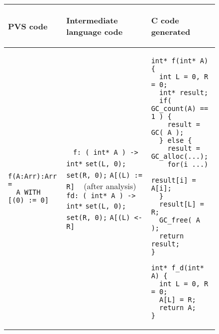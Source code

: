 \documentclass[12pt,a4paper]{article}
\newcommand{\cl}[1]{\texttt{#1}}
\begin{document}
\begin{figure}[!ht]
\begin{tabular}{|p{5.5cm}|p{5.5cm}|p{6cm}|}
\hline
\begin{center}
PVS code
\end{center} &
\begin{center}
Intermediate language code
\end{center} &
\begin{center}
C code generated
\end{center} \\ \hline

\begin{lstlisting}
f(A:Arr):Arr =
  A WITH [(0) := 0]
\end{lstlisting} &
\ \newline
\cl{f: ( int* A ) -> int*} \newline
\cl{set(L, 0);} \newline
\cl{set(R, 0);} \newline
\cl{A[(L) := R]} \newline
\ \newline
(after analysis) \newline
\ \newline
\cl{fd: ( int* A ) -> int*} \newline
\cl{set(L, 0);} \newline
\cl{set(R, 0);} \newline
\cl{A[(L) <- R]}
 &
\begin{lstlisting}
int* f(int* A) {
  int L = 0, R = 0;
  int* result;
  if( GC_count(A) == 1 ) {
    result = GC( A );
  } else {
    result = GC_alloc(...);
    for(i ...)
      result[i] = A[i];
  }
  result[L] = R;
  GC_free( A );
  return result;
}

int* f_d(int* A) {
  int L = 0, R = 0;
  A[L] = R;
  return A;
}
\end{lstlisting} \\ \hline


\end{tabular}
\end{figure}
\end{document}
